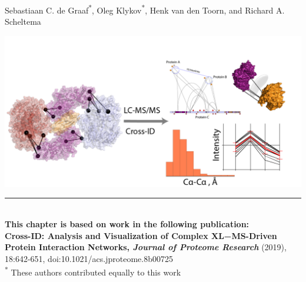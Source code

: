  \label{ch-2}
\vspace*{0.25cm}

{\footnotesize Sebastiaan C. de Graaf\textsuperscript{*}, Oleg Klykov\textsuperscript{*}, Henk van den Toorn, and Richard A. Scheltema}

\begin{center}
  \vspace{3cm}
  \includegraphics[]{Chapter.2/Figures/ch2.png}
  \vspace{0.25cm}
\end{center}

\begin{flushleft}
  \vspace*{\fill}
  \rule{\textwidth}{1pt}\\[0cm]
  \textbf{This chapter is based on work in the following publication:}\\
  \footnotesize{
    \textbf{Cross-ID: Analysis and Visualization of Complex XL−MS-Driven
      Protein Interaction Networks, \emph{Journal of Proteome Research}} (2019), 18:642-651, doi:10.1021/acs.jproteome.8b00725\\
    \vspace{0.3cm}
    \textsuperscript{*} These authors contributed equally to this work}
\end{flushleft}


